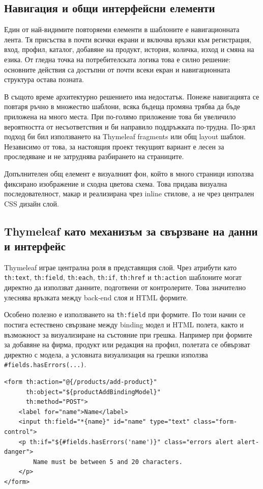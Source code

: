 \subsection{Навигация и общи интерфейсни елементи}

Един от най-видимите повторяеми елементи в шаблоните е навигационната лента. Тя присъства в почти всички екрани и включва връзки към регистрация, вход, профил, каталог, добавяне на продукт, история, количка, изход и смяна на езика. От гледна точка на потребителската логика това е силно решение: основните действия са достъпни от почти всеки екран и навигационната структура остава позната.

В същото време архитектурно решението има недостатък. Понеже навигацията се повтаря ръчно в множество шаблони, всяка бъдеща промяна трябва да бъде приложена на много места. При по-голямо приложение това би увеличило вероятността от несъответствия и би направило поддръжката по-трудна. По-зрял подход би бил използването на Thymeleaf fragments или общ layout шаблон. Независимо от това, за настоящия проект текущият вариант е лесен за проследяване и не затруднява разбирането на страниците.

Допълнителен общ елемент е визуалният фон, който в много страници използва фиксирано изображение и сходна цветова схема. Това придава визуална последователност, макар и реализирана чрез inline стилове, а не чрез централен CSS дизайн слой.

\subsection{Thymeleaf като механизъм за свързване на данни и интерфейс}

Thymeleaf \cite{thymeleaf} играе централна роля в представящия слой. Чрез атрибути като \texttt{th:text}, \texttt{th:field}, \texttt{th:each}, \texttt{th:if}, \texttt{th:href} и \texttt{th:action} шаблоните могат директно да използват данните, подготвени от контролерите. Това значително улеснява връзката между back-end слоя и HTML формите.

Особено полезно е използването на \texttt{th:field} при формите. По този начин се постига естествено свързване между binding модел и HTML полета, както и възможност за визуализиране на състояние при грешка. Например при формите за добавяне на фирма, продукт или редакция на профил, полетата се обвързват директно с модела, а условната визуализация на грешки използва \texttt{\#fields.hasErrors(...)}.

\begin{lstlisting}[caption={Типичен Thymeleaf фрагмент за форма},label={lst:thymeleaf-form}]
<form th:action="@{/products/add-product}"
      th:object="${productAddBindingModel}"
      th:method="POST">
    <label for="name">Name</label>
    <input th:field="*{name}" id="name" type="text" class="form-control">
    <p th:if="${#fields.hasErrors('name')}" class="errors alert alert-danger">
        Name must be between 5 and 20 characters.
    </p>
</form>
\end{lstlisting}

